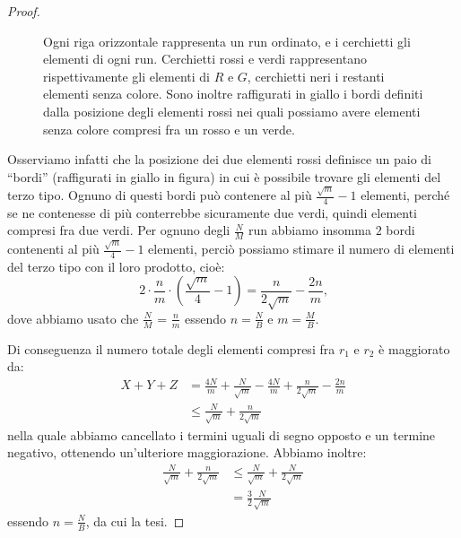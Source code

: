 \begin{proof}
\begin{figure}
        \caption{Ogni riga orizzontale rappresenta un run ordinato, e i 
        cerchietti gli elementi di ogni run. Cerchietti rossi e verdi 
        rappresentano rispettivamente gli elementi di \(R\) e \(G\), 
        cerchietti neri i restanti elementi senza colore. Sono inoltre 
        raffigurati in giallo i bordi definiti dalla posizione degli 
        elementi rossi nei quali possiamo avere elementi senza colore 
        compresi fra un rosso e un verde.}
    \end{figure}
    Osserviamo infatti che la posizione dei due elementi rossi definisce
    un paio di ``bordi'' (raffigurati in giallo in figura) in cui \`e
    possibile trovare gli elementi del terzo tipo. Ognuno di questi 
    bordi può contenere al pi\`u \(\frac{\sqrt{m}}{4}-1\) elementi,
    perché se ne contenesse di pi\`u conterrebbe sicuramente due verdi,
    quindi elementi compresi fra due verdi. Per ognuno degli 
    \(\frac{N}{M}\) run abbiamo insomma \(2\) bordi contenenti al pi\`u 
    \(\frac{\sqrt{m}}{4}-1\) elementi, perci\`o possiamo stimare il
    numero di elementi del terzo tipo con il loro prodotto, cio\`e:
    \[
        2 \cdot \frac{n}{m} \cdot \left( \frac{\sqrt{m}}{4}-1 \right) = \frac{n}{2\sqrt{m}} - \frac{2n}{m}\mbox{,}
    \]
    dove abbiamo usato che \(\frac{N}{M}\) = \(\frac{n}{m}\) essendo
    \(n = \frac{N}{B}\) e \(m = \frac{M}{B}\).
        
    Di conseguenza il numero totale degli elementi compresi fra \(r_1\) 
    e \(r_2\) è maggiorato da:
    \begin{align}
        X + Y + Z &= \frac{4N}{m} + \frac{N}{\sqrt{m}} - \frac{4N}{m} + \frac{n}{2\sqrt{m}} - \frac{2n}{m} \nonumber \\
        &\le \frac{N}{\sqrt{m}} + \frac{n}{2\sqrt{m}} \nonumber
    \end{align}
    nella quale abbiamo cancellato i termini uguali di segno opposto e un
    termine negativo, ottenendo un'ulteriore maggiorazione. Abbiamo
    inoltre:
    \begin{align}
        \frac{N}{\sqrt{m}} + \frac{n}{2\sqrt{m}} &\le \frac{N}{\sqrt{m}} + \frac{N}{2\sqrt{m}} \nonumber \\
        &= \frac{3}{2}\frac{N}{\sqrt{m}} \nonumber
    \end{align}
    essendo \(n = \frac{N}{B}\), da cui la tesi.
\end{proof}